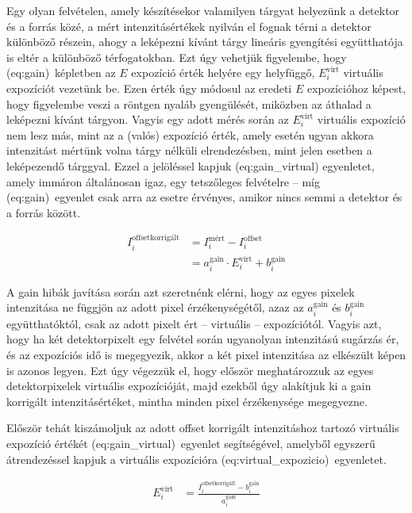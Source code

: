 \documentclass[a4paper,12pt,twoside]{article}
\begin{document}
Egy olyan felvételen, amely készítésekor valamilyen tárgyat helyezünk a detektor és a forrás közé, a mért intenzitásértékek nyilván el fognak térni a detektor különböző részein, ahogy a leképezni kívánt tárgy lineáris gyengítési együtthatója is eltér a különböző térfogatokban. Ezt úgy vehetjük figyelembe, hogy  \aref({eq:gain})~képletben az $E$ expozíció érték helyére egy helyfüggő, $E_i^{\text{virt}}$ virtuális expozíciót vezetünk be. Ezen érték úgy módosul az eredeti $E$ expozícióhoz képest, hogy figyelembe veszi a röntgen nyaláb gyengülését, miközben az áthalad a leképezni kívánt tárgyon. Vagyis egy adott mérés során az $E_i^{\text{virt}}$ virtuális expozíció nem lesz más, mint az a (valós) expozíció érték, amely esetén ugyan akkora intenzitást mértünk volna tárgy nélküli elrendezésben, mint jelen esetben a leképezendő tárggyal. Ezzel a jelöléssel kapjuk \aref({eq:gain_virtual}) egyenletet, amely immáron általánosan igaz, egy tetszőleges felvételre -- míg \aref({eq:gain})~egyenlet csak arra az esetre érvényes, amikor nincs semmi a detektor és a forrás között.

\begin{equation}
\label{eq:gain_virtual}
\begin{split}
I_i^{\text{offsetkorrigált}}  &=  I_i^{\text{mért}} - I_i^{\text{offset}} \\&=  a_i^{\text{gain}} \cdot E_i^{\text{virt}} + b_i^{\text{gain}}
\end{split}
\end{equation}


A gain hibák javítása során azt szeretnénk elérni, hogy az egyes pixelek intenzitása ne függjön az adott pixel érzékenységétől, azaz az $a_i^{\text{gain}}  $ és $b_i^{\text{gain}}$  együtthatóktól, csak az adott pixelt ért -- virtuális -- expozíciótól. Vagyis azt, hogy ha két detektorpixelt egy felvétel során ugyanolyan intenzitású sugárzás ér, és az expozíciós idő is megegyezik, akkor a két pixel intenzitása az elkészült képen is azonos legyen. 
Ezt úgy végezzük el, hogy először meghatározzuk az egyes detektorpixelek virtuális expozícióját, majd ezekből úgy alakítjuk ki a gain korrigált intenzitásértéket, mintha minden pixel érzékenysége megegyezne.

Először tehát kiszámoljuk az adott offset korrigált intenzitáshoz tartozó virtuális expozíció értékét \aref({eq:gain_virtual})~egyenlet segítségével, amelyből egyszerű átrendezéssel kapjuk a virtuális expozícióra  \aref({eq:virtual_expozicio})~egyenletet. 

\begin{equation}
\label{eq:virtual_expozicio}
\begin{split}
 E_i^{\text{virt}} &= \frac{I_i^{\text{offsetkorrigált}} -  b_i^{\text{gain}}}{  a_i^{\text{gain}}}
 \end{split}
\end{equation}
\end{document}
